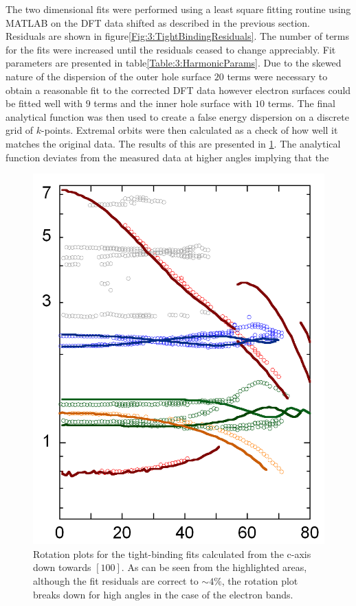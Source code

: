 The two dimensional fits were performed using a least square fitting routine using MATLAB on the DFT data shifted as described in the previous section. Residuals are shown in figure\ref{Fig:3:TightBindingResiduals}. The number of terms for the fits were increased until the residuals ceased to change appreciably. Fit parameters are presented in table\ref{Table:3:HarmonicParams}. Due to the skewed nature of the \kz dispersion of the outer hole surface $20$ terms were necessary to obtain a reasonable fit to the corrected DFT data however electron surfaces could be fitted well with $9$ terms and the inner hole surface with $10$ terms. The final analytical function was then used to create a false energy dispersion on a discrete grid of $k$-points. Extremal orbits were then calculated as a check of how well it matches the original data. The results of this are presented in \fig\ref{Fig:3:TightBindingFitRotationPlot}. The analytical function deviates from the measured data at higher angles implying that the 

\begin{figure}[htbp]
    \begin{center}
        \includegraphics[scale=0.9]{Chapter3-dHvABaFe2P2/Figures/AngleDepMeasurements/TightBindingFits/TightBindingFits}
        \caption{Rotation plots for the tight-binding fits calculated from the c-axis down towards $[100]$. As can be seen from the highlighted areas, although the fit residuals are correct to $\sim4\%$, the rotation plot breaks down for high angles in the case of the electron bands.}
        \label{Fig:3:TightBindingFitRotationPlot}
    \end{center}
\end{figure}

